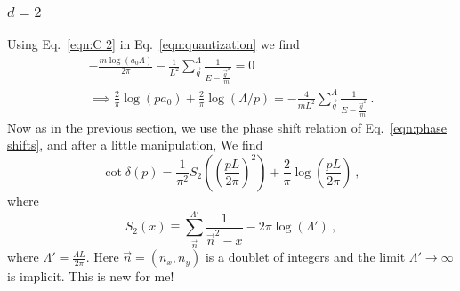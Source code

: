 \documentclass[11pt]{article}
\begin{document}
\subsubsection{$d=2$}
Using Eq.~\eqref{eqn:C 2} in Eq.~\eqref{eqn:quantization} we find
\begin{multline}
-\frac{m \log (a_0\Lambda)}{2 \pi }-\frac{1}{L^2}\sum_{\vec{q}}^\Lambda \frac { 1 } { E - \frac{\vec{q}^2}{m} }=0\\
\implies
\frac{2}{\pi}\log (pa_0)+\frac{2}{\pi}\log(\Lambda/p)=-\frac{4}{mL^2}\sum_{\vec{q}}^\Lambda \frac { 1 } { E - \frac{\vec{q}^2}{m} }\ .
\end{multline}
Now as in the previous section, we use the phase shift relation of Eq.~\eqref{eqn:phase shifts}, and after a little manipulation, We find
\begin{equation}
\cot \delta(p)=\frac{1}{\pi^2}S_2\left(\left(\frac{pL}{2\pi}\right)^2\right)+\frac{2}{\pi}\log\left(\frac{pL}{2\pi}\right)\ ,
\end{equation}
where
\begin{equation}\label{eqn:S2}
S_2(x)\equiv\sum_{\vec{n}}^{\Lambda'} \frac { 1 } { \vec{n}^2 -x}-2\pi\log\left(\Lambda'\right)\ ,
\end{equation}
where $\Lambda'=\frac{\Lambda L}{2\pi}$.
Here $\vec{n}=(n_x,n_y)$ is a doublet of integers and the limit $\Lambda'\to\infty$ is implicit.  This is new for me!
\end{document}
